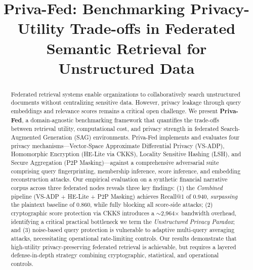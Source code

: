 \documentclass[conference]{IEEEtran}
\begin{document}
\title{Priva-Fed: Benchmarking Privacy-Utility Trade-offs in Federated Semantic Retrieval for Unstructured Data}

\author{
}

\maketitle

\begin{abstract}
Federated retrieval systems enable organizations to collaboratively search unstructured documents without centralizing sensitive data. However, privacy leakage through query embeddings and relevance scores remains a critical open challenge. We present \textbf{Priva-Fed}, a domain-agnostic benchmarking framework that quantifies the trade-offs between retrieval utility, computational cost, and privacy strength in federated Search-Augmented Generation (SAG) environments. Priva-Fed implements and evaluates four privacy mechanisms---Vector-Space Approximate Differential Privacy (VS-ADP), Homomorphic Encryption (HE-Lite via CKKS), Locality Sensitive Hashing (LSH), and Secure Aggregation (P2P Masking)---against a comprehensive adversarial suite comprising query fingerprinting, membership inference, score inference, and embedding reconstruction attacks. Our empirical evaluation on a synthetic financial narrative corpus across three federated nodes reveals three key findings: (1) the \textit{Combined} pipeline (VS-ADP + HE-Lite + P2P Masking) achieves Recall@1 of 0.940, \emph{surpassing} the plaintext baseline of 0.860, while fully blocking all score-side attacks; (2) cryptographic score protection via CKKS introduces a $\sim$2,964$\times$ bandwidth overhead, identifying a critical practical bottleneck we term the \textit{Unstructured Privacy Paradox}; and (3) noise-based query protection is vulnerable to adaptive multi-query averaging attacks, necessitating operational rate-limiting controls. Our results demonstrate that high-utility privacy-preserving federated retrieval is achievable, but requires a layered defense-in-depth strategy combining cryptographic, statistical, and operational controls.
\end{abstract}
\end{document}
